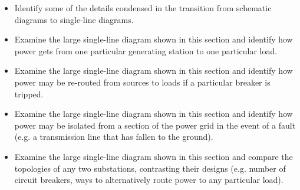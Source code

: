 \begin{itemize}
\item{} Identify some of the details condensed in the transition from schematic diagrams to single-line diagrams.
\item{} Examine the large single-line diagram shown in this section and identify how power gets from one particular generating station to one particular load.
\item{} Examine the large single-line diagram shown in this section and identify how power may be re-routed from sources to loads if a particular breaker is tripped.
\item{} Examine the large single-line diagram shown in this section and identify how power may be isolated from a section of the power grid in the event of a fault (e.g. a transmission line that has fallen to the ground).
\item{} Examine the large single-line diagram shown in this section and compare the topologies of any two substations, contrasting their designs (e.g. number of circuit breakers, ways to alternatively route power to any particular load).   
\end{itemize}














